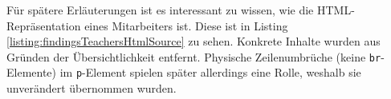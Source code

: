     Für spätere Erläuterungen ist es interessant zu wissen,
    wie die HTML-Repräsentation eines Mitarbeiters ist.
    Diese ist in Listing \ref{listing:findingsTeachersHtmlSource} zu sehen.
    Konkrete Inhalte wurden aus Gründen der Übersichtlichkeit entfernt.
    Physische Zeilenumbrüche (keine \texttt{br}-Elemente) im \texttt{p}-Element
    spielen später allerdings eine Rolle,
    weshalb sie unverändert übernommen wurden.

    